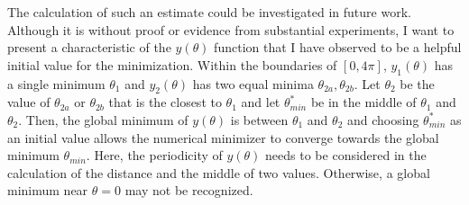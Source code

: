 The calculation of such an estimate could be investigated in future work.
Although it is without proof or evidence from substantial experiments, I want to
present a characteristic of the $y(\theta)$ function that I have observed to be
a helpful initial value for the minimization.
Within the boundaries of $[0, 4\pi]$, $y_1(\theta)$ has a single minimum
$\theta_1$ and $y_2(\theta)$ has two equal minima $\theta_{2a}, \theta_{2b}$.
Let $\theta_2$ be the value of $\theta_{2a}$ or $\theta_{2b}$ that is the
closest to $\theta_1$ and let $\theta_{min}^*$ be in the middle of $\theta_1$
and $\theta_2$.
Then, the global minimum of $y(\theta)$ is between $\theta_1$ and $\theta_2$
and choosing $\theta_{min}^*$ as an initial value allows the numerical minimizer
to converge towards the global minimum $\theta_{min}$.
Here, the periodicity of $y(\theta)$ needs to be considered in the calculation
of the distance and the middle of two values.
Otherwise, a global minimum near $\theta = 0$ may not be recognized.
